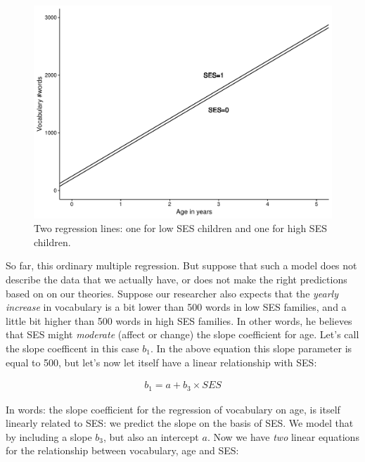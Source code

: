 \documentclass[]{book}\usepackage[]{graphicx}\usepackage[]{color}
\makeatletter
\def\maxwidth{ %
  \ifdim\Gin@nat@width>\linewidth
    \linewidth
  \else
    \Gin@nat@width
  \fi
}
\newenvironment{knitrout}{}{} %
\makeatother
\begin{document}
\begin{knitrout}
\color{fgcolor}\begin{figure}
\includegraphics[width=\maxwidth]{figure/summary_plot0-1} \caption[Two regression lines]{Two regression lines: one for low SES children and one for high SES children.}\label{fig:summary_plot0}
\end{figure}


\end{knitrout}

So far, this ordinary multiple regression. But suppose that such a model does not describe the data that we actually have, or does not make the right predictions based on on our theories. Suppose our researcher also expects that the \textit{yearly increase} in vocabulary is a bit lower than 500 words in low SES families, and a little bit higher than 500 words in high SES families. In other words, he believes that SES might \textit{moderate} (affect or change) the slope coefficient for age. Let's call the slope coefficent in this case $b_1$. In the above equation this slope parameter is equal to 500, but let's now let itself have a linear relationship with SES:

\begin{eqnarray}
b_1 = a + b_3 \times SES
\end{eqnarray}

In words: the slope coefficient for the regression of vocabulary on age, is itself linearly related to SES: we predict the slope on the basis of SES. We model that by including a slope $b_3$, but also an intercept $a$. Now we have \textit{two} linear equations for the relationship between vocabulary, age and SES:
\end{document}
